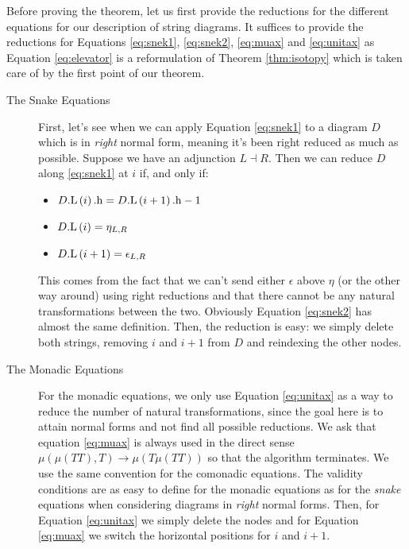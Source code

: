 \documentclass[math, english, info]{cours}
\begin{document}
Before proving the theorem, let us first provide the reductions for the different
equations for our description of string diagrams.
It suffices to provide the reductions for Equations \ref{eq:snek1}, \ref{eq:snek2},
\ref{eq:muax} and \ref{eq:unitax} as Equation \ref{eq:elevator} is a
reformulation of Theorem \ref{thm:isotopy} which is taken care of by the first
point of our theorem.
\begin{description}
	\item[The Snake Equations]
	      First, let's see when we can apply Equation \ref{eq:snek1} to a diagram $D$ which is in \emph{right} normal form, meaning it's been right reduced as much as possible.
	      Suppose we have an adjunction $L \dashv R$.
	      Then we can reduce $D$ along \eqref{eq:snek1} at $i$ if, and only if:
	      \begin{itemize}
		      \item $D\mathrm{.L}\left(i\right)\mathrm{.h} = D\mathrm{.L}\left(i + 1\right)\mathrm{.h} - 1$
		      \item $D\mathrm{.L}\left(i\right) = \eta_{L, R}$
		      \item $D\mathrm{.L}\left(i + 1\right) = \epsilon_{L, R}$
	      \end{itemize}
	      This comes from the fact that we can't send either $\epsilon$
	      above $\eta$ (or the other way around) using right reductions and
	      that there cannot be any natural transformations between the two.
	      Obviously Equation \ref{eq:snek2} has almost the same definition.
	      Then, the reduction is easy: we simply delete both strings,
	      removing $i$ and $i + 1$ from $D$ and reindexing the other nodes.
	\item[The Monadic Equations] For the monadic equations, we only use
	      Equation \ref{eq:unitax} as a way to reduce the number of natural
	      transformations, since the goal here is to attain normal forms
	      and not find all possible reductions.
	      We ask that equation \ref{eq:muax} is always used in the direct
	      sense $\mu\left( \mu\left( TT \right),T \right) \to \mu\left(
		      T\mu\left( TT \right) \right)$ so that the algorithm terminates.
	      We use the same convention for the comonadic equations.
	      The validity conditions are as easy to define for the monadic
	      equations as for the \emph{snake} equations when considering
	      diagrams in \emph{right} normal forms.
	      Then, for Equation \eqref{eq:unitax} we simply delete the nodes
	      and for Equation \eqref{eq:muax} we switch the horizontal
	      positions for $i$ and $i + 1$.
\end{description}
\end{document}
